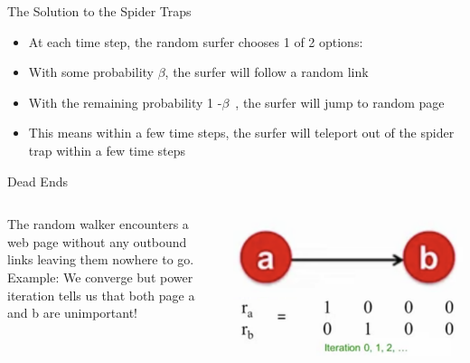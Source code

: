 \documentclass{beamer}
\begin{document}
\begin{frame}[t]{The Solution to the Spider Traps}
    \begin{itemize}
        \item At each time step, the random surfer chooses 1 of 2 options:
        \item With some probability $\beta$, the surfer will follow a random link
        \item With the remaining probability 1 -$\beta$ , the surfer will jump to random page
        \item This means within a few time steps, the surfer will teleport out of the spider trap within a few time steps
    \end{itemize}
\end{frame}
    
\begin{frame}[t]{Dead Ends}
\begin{columns}
    \begin{column}{0.5\textwidth}
        \begin{outline}
            \1 The random walker encounters a web page without any outbound links leaving them nowhere to go.
            \1 Example:
            We converge but power iteration
            tells us that both page a and b are
            unimportant!
        \end{outline}
    \end{column}
    \begin{column}{0.5\textwidth}
        \includegraphics[width=\textwidth]{deadenda.png}
        \includegraphics[width=\textwidth]{deadendb.png}
    \end{column}
\end{columns}
\end{frame}
\end{document}
